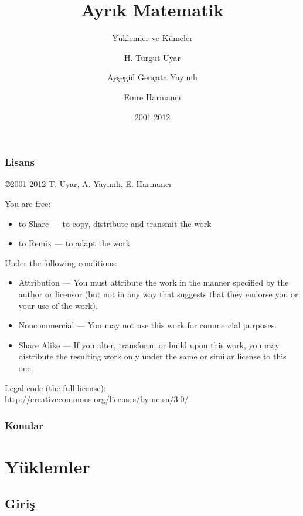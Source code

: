 \documentclass[dvipsnames]{beamer}
\title{Ayrık Matematik}
\subtitle{Yüklemler ve Kümeler}
\author{H. Turgut Uyar \and Ayşegül Gençata Yayımlı \and Emre Harmancı}
\date{2001-2012}
\theoremstyle{definition}
\theoremstyle{example}
\theoremstyle{plain}
\begin{document}
\begin{frame}
  \titlepage
\end{frame}

\begin{frame}
  \frametitle{Lisans}

  \hfill
  \copyright 2001-2012 T. Uyar, A. Yayımlı, E. Harmancı

  \vfill
  \begin{tiny}
    You are free:
    \begin{itemize}
      \item to Share — to copy, distribute and transmit the work
      \item to Remix — to adapt the work
    \end{itemize}

    Under the following conditions:
    \begin{itemize}
      \item Attribution — You must attribute the work in the manner specified by
        the author or licensor (but not in any way that suggests that they
        endorse you or your use of the work).

      \item Noncommercial — You may not use this work for commercial purposes.

      \item Share Alike — If you alter, transform, or build upon this work, you
        may distribute the resulting work only under the same or similar license
        to this one.
    \end{itemize}
  \end{tiny}

  \vfill
  Legal code (the full license):\\
  \url{http://creativecommons.org/licenses/by-nc-sa/3.0/}
\end{frame}

\begin{frame}
  \frametitle{Konular}
  \tableofcontents
\end{frame}

\section{Yüklemler}

\subsection{Giriş}
\end{document}
